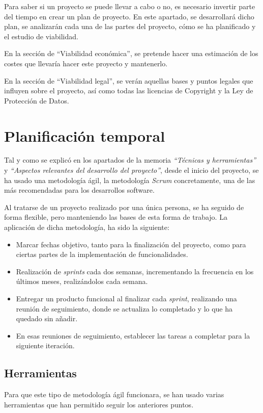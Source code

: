 Para saber si un proyecto se puede llevar a cabo o no, es necesario invertir parte del tiempo en crear un plan de proyecto. En este apartado, se desarrollará dicho plan, se analizarán cada una de las partes del proyecto, cómo se ha planificado y el estudio de viabilidad.

En la sección de ``Viabilidad económica'', se pretende hacer una estimación de los costes que llevaría hacer este proyecto y mantenerlo.

En la sección de ``Viabilidad legal'', se verán aquellas bases y puntos legales que influyen sobre el proyecto, así como todas las licencias de Copyright y la Ley de Protección de Datos. 

\section{Planificación temporal}
Tal y como se explicó en los apartados de la memoria \textit{``Técnicas y herramientas''} y \textit{``Aspectos relevantes del desarrollo del proyecto''}, desde el inicio del proyecto, se ha usado una metodología ágil, la metodología \textit{Scrum} concretamente, una de las más recomendadas para los desarrollos software.

Al tratarse de un proyecto realizado por una única persona, se ha seguido de forma flexible, pero manteniendo las bases de esta forma de trabajo. La aplicación de dicha metodología, ha sido la siguiente:

\begin{itemize}
    \item Marcar fechas objetivo, tanto para la finalización del proyecto, como para ciertas partes de la implementación de funcionalidades.
    \item Realización de \textit{sprints} cada dos semanas, incrementando la frecuencia en los últimos meses, realizándolos cada semana.
    \item Entregar un producto funcional al finalizar cada \textit{sprint}, realizando una reunión de seguimiento, donde se actualiza lo completado y lo que ha quedado sin añadir.
    \item En esas reuniones de seguimiento, establecer las tareas a completar para la siguiente iteración.
\end{itemize}

\subsection{Herramientas}
Para que este tipo de metodología ágil funcionara, se han usado varias herramientas que han permitido seguir los anteriores puntos.

